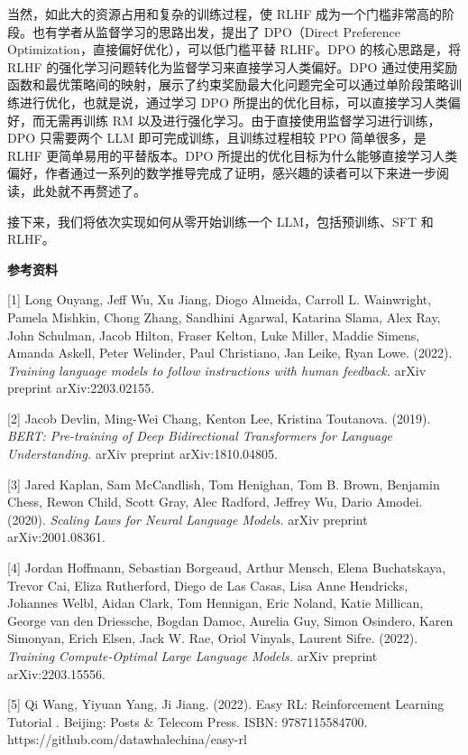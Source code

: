 \documentclass[12pt,a4paper]{book}
\begin{document}
当然，如此大的资源占用和复杂的训练过程，使 RLHF
成为一个门槛非常高的阶段。也有学者从监督学习的思路出发，提出了
DPO（Direct Preference Optimization，直接偏好优化），可以低门槛平替
RLHF。DPO 的核心思路是，将 RLHF
的强化学习问题转化为监督学习来直接学习人类偏好。DPO
通过使用奖励函数和最优策略间的映射，展示了约束奖励最大化问题完全可以通过单阶段策略训练进行优化，也就是说，通过学习
DPO 所提出的优化目标，可以直接学习人类偏好，而无需再训练 RM
以及进行强化学习。由于直接使用监督学习进行训练，DPO 只需要两个 LLM
即可完成训练，且训练过程相较 PPO 简单很多，是 RLHF
更简单易用的平替版本。DPO
所提出的优化目标为什么能够直接学习人类偏好，作者通过一系列的数学推导完成了证明，感兴趣的读者可以下来进一步阅读，此处就不再赘述了。

接下来，我们将依次实现如何从零开始训练一个 LLM，包括预训练、SFT 和
RLHF。

\textbf{参考资料}

{[}1{]} Long Ouyang, Jeff Wu, Xu Jiang, Diogo Almeida, Carroll L.
Wainwright, Pamela Mishkin, Chong Zhang, Sandhini Agarwal, Katarina
Slama, Alex Ray, John Schulman, Jacob Hilton, Fraser Kelton, Luke
Miller, Maddie Simens, Amanda Askell, Peter Welinder, Paul Christiano,
Jan Leike, Ryan Lowe. (2022). \emph{Training language models to follow
instructions with human feedback.} arXiv preprint arXiv:2203.02155.

{[}2{]} Jacob Devlin, Ming-Wei Chang, Kenton Lee, Kristina Toutanova.
(2019). \emph{BERT: Pre-training of Deep Bidirectional Transformers for
Language Understanding.} arXiv preprint arXiv:1810.04805.

{[}3{]} Jared Kaplan, Sam McCandlish, Tom Henighan, Tom B. Brown,
Benjamin Chess, Rewon Child, Scott Gray, Alec Radford, Jeffrey Wu, Dario
Amodei. (2020). \emph{Scaling Laws for Neural Language Models.} arXiv
preprint arXiv:2001.08361.

{[}4{]} Jordan Hoffmann, Sebastian Borgeaud, Arthur Mensch, Elena
Buchatskaya, Trevor Cai, Eliza Rutherford, Diego de Las Casas, Lisa Anne
Hendricks, Johannes Welbl, Aidan Clark, Tom Hennigan, Eric Noland, Katie
Millican, George van den Driessche, Bogdan Damoc, Aurelia Guy, Simon
Osindero, Karen Simonyan, Erich Elsen, Jack W. Rae, Oriol Vinyals,
Laurent Sifre. (2022). \emph{Training Compute-Optimal Large Language
Models.} arXiv preprint arXiv:2203.15556.

{[}5{]} Qi Wang, Yiyuan Yang, Ji Jiang. (2022). Easy RL: Reinforcement
Learning Tutorial . Beijing: Posts \& Telecom Press. ISBN:
9787115584700. https://github.com/datawhalechina/easy-rl
\end{document}
